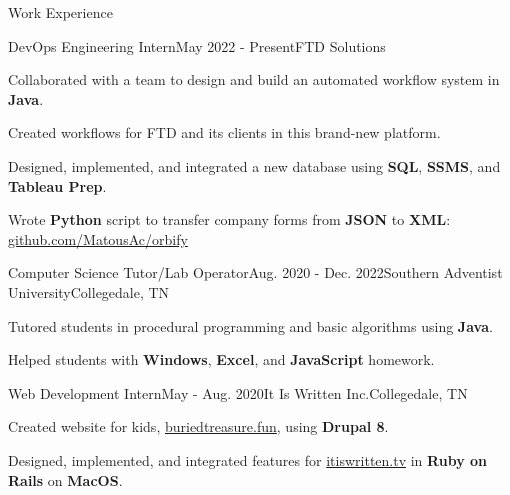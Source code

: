 \begin{rSection}{Work Experience}
  \begin{job}{DevOps Engineering Intern}{May 2022 - Present}{FTD Solutions}{}
    \item Collaborated with a team to design and build an automated workflow system in {\bf Java}.
    \item Created workflows for FTD and its clients in this brand-new platform.
    \item Designed, implemented, and integrated a new database using {\bf SQL}, {\bf SSMS}, and {\bf Tableau Prep}.
    \item Wrote {\bf Python} script to transfer company forms from {\bf JSON} to {\bf XML}: \href{https://github.com/MatousAc/orbify}{github.com/MatousAc/orbify}
  \end{job}

  \begin{job}{Computer Science Tutor/Lab Operator}{Aug. 2020 - Dec. 2022}{Southern Adventist University}{Collegedale, TN}{}
    \item Tutored students in procedural programming and basic algorithms using {\bf Java}.
    \item Helped students with {\bf Windows}, {\bf Excel}, and {\bf JavaScript} homework.
  \end{job}


  \begin{job}{Web Development Intern}{May - Aug. 2020}{It Is Written Inc.}{Collegedale, TN}
    \item Created website for kids, \href{https://buriedtreasure.fun/}{buriedtreasure.fun}, using {\bf Drupal 8}.
    \item Designed, implemented, and integrated features for \href{https://itiswritten.tv}{itiswritten.tv} in {\bf Ruby on Rails} on {\bf MacOS}.
  \end{job}
\end{rSection}
